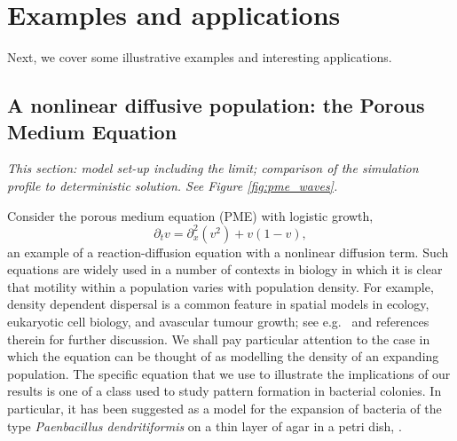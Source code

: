 \documentclass[12pt]{article}
\newcommand{\comment}[1]{{\color{blue} \it #1}}
\begin{document}
\section{Examples and applications}

Next,
we cover some illustrative examples
and interesting applications.

\subsection{A nonlinear diffusive population: the Porous Medium Equation}

\comment{
    This section:
    model set-up including the limit;
    comparison of the simulation profile to deterministic solution.
    See Figure \ref{fig:pme_waves}.
}

Consider the porous medium equation (PME) with logistic growth,
\begin{equation}
    \label{eqn:pme}
    \partial_t v = \partial_x^2 (v^2) + v (1 - v) ,
\end{equation}
an example of a reaction-diffusion equation with a nonlinear diffusion term.
Such equations are widely used in a number of contexts in biology in which
it is clear that motility within a population varies with population density.
For example, density dependent dispersal is a common feature in spatial
models in ecology, eukaryotic cell biology, and avascular tumour growth;
see e.g.~\cite{sherratt:2010} and references therein for further discussion. 
We shall pay particular attention to the case in which the equation can be 
thought of as modelling the density of an expanding population. 
The specific equation that we use to illustrate the implications of
our results is one of a class used to study pattern formation in 
bacterial colonies. In particular, it has been suggested as a model for
the expansion of bacteria of the type {\em Paenbacillus dendritiformis} on
a thin layer of agar in a petri dish, 
\cite{cohen/golding/kozlovsky/benjacob/ron:1999}. 
\end{document}
